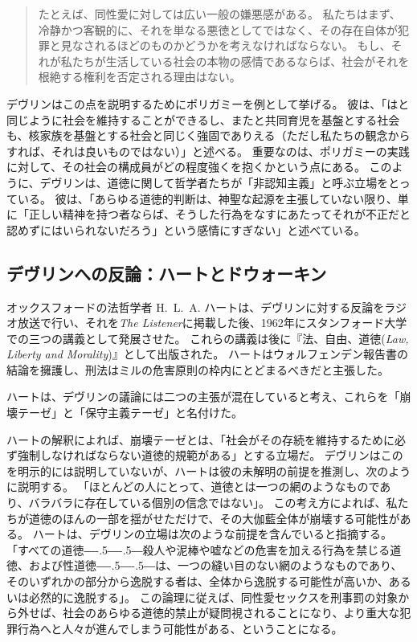 \documentclass[paper=a4,book,openany]{jlreq}
\newcommand{\ig}[1]{}           %
\def\DDASH{―\kern-.5\zw―\kern-.5\zw―} %
\begin{document}
\begin{quote}
たとえば、同性愛に対しては広い一般の嫌悪感がある。
私たちはまず、冷静かつ客観的に、それを単なる悪徳としてではなく、その存在自体が犯罪と見なされるほどのものかどうかを考えなければならない。
もし、それが私たちが生活している社会の本物の感情であるならば、社会がそれを根絶する権利を否定される理由はない\citep[p.40]{devlin65:_enfor_moral}。
\end{quote}

デヴリン\ig{Patrick Devlin}はこの点を説明するためにポリガミーを例として挙げる。
彼は、「はと同じように社会を維持することができるし、またと共同育児を基盤とする社会も、核家族を基盤とする社会と同じく強固でありえる（ただし私たちの観念からすれば、それは良いものではない）」と述べる\citep[p.114]{devlin65:_enfor_moral}。
重要なのは、ポリガミーの実践に対して、その社会の構成員がどの程度強くを抱くかという点にある。
このように、デヴリン\ig{Patrick Devlin}は、道徳に関して哲学者たちが「非認知主義」と呼ぶ立場をとっている。
彼は、「あらゆる道徳的判断は、神聖な起源を主張していない限り、単に「正しい精神を持つ者ならば、そうした行為をなすにあたってそれが不正だと認めずにはいられないだろう」という感情にすぎない」と述べている\citep[p.17]{devlin65:_enfor_moral}。

\subsection{デヴリンへの反論：ハートとドウォーキン}

オックスフォードの法哲学者 H.~L.~A. ハートは、デヴリン\ig{Patrick Devlin}に対する反論をラジオ放送で行い、それを\emph{The Listener}に掲載した後、1962年にスタンフォード大学での三つの講義として発展させた。
これらの講義は後に『法、自由、道徳(\emph{Law, Liberty and Morality})』として出版された。
ハートはウォルフェンデン報告書の結論を擁護し、刑法はミルの危害原則の枠内にとどまるべきだと主張した。

ハートは、デヴリン\ig{Patrick Devlin}の議論には二つの主張が混在していると考え、これらを「崩壊テーゼ」と「保守主義テーゼ」と名付けた\citep[p.115]{hart63:_law_liber_and_moral}。

ハートの解釈によれば、崩壊テーゼとは、「社会がその存続を維持するために必ず強制しなければならない道徳的規範がある」とする立場だ。
デヴリン\ig{Patrick Devlin}はこのを明示的には説明していないが、ハートは彼の未解明の前提を推測し、次のように説明する。
「ほとんどの人にとって、道徳とは一つの網のようなものであり、バラバラに存在している個別の信念ではない」\citep[pp.50--51]{hart63:_law_liber_and_moral}。
この考え方によれば、私たちが道徳のほんの一部を揺がせただけで、その大伽藍全体が崩壊する可能性がある。
ハートは、デヴリン\ig{Patrick Devlin}の立場は次のような前提を含んでいると指摘する。
「すべての道徳{\DDASH}殺人や泥棒や嘘などの危害を加える行為を禁じる道徳、および性道徳{\DDASH}は、一つの縫い目のない網のようなものであり、そのいずれかの部分から逸脱する者は、全体から逸脱する可能性が高いか、あるいは必然的に逸脱する」\citep[p.50]{hart63:_law_liber_and_moral}。
この論理に従えば、同性愛セックスを刑事罰の対象から外せば、社会のあらゆる道徳的禁止が疑問視されることになり、より重大な犯罪行為へと人々が進んでしまう可能性がある、ということになる。
\end{document}
